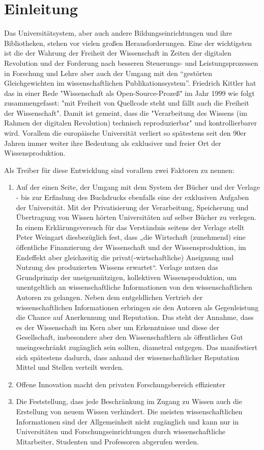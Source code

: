 \section{Einleitung} 
Das Universitätsystem, aber auch andere Bildungseinrichtungen und ihre Bibliotheken, stehen vor vielen großen Herausforderungen. Eine der wichtigsten ist die der Wahrung der Freiheit der Wissenschaft in Zeiten der digitalen Revolution und der Forderung nach besseren Steuerungs- und Leistungsprozessen in Forschung und Lehre aber auch der Umgang mit den “gestörten Gleichgewichten im wissenschaftlichen Publikationssystem”\cite{cite:0}. Friedrich Kittler hat das in einer Rede "Wissenschaft als Open-Source-Prozeß" im Jahr 1999 wie folgt zusammengefasst: "mit Freiheit von Quellcode steht und fällt auch die Freiheit der Wissenschaft". Damit ist gemeint, dass die "Verarbeitung des Wissens (im Rahmen der digitalen Revolution) technisch reproduzierbar"\cite{cite:1} und kontrollierbarer wird. Vorallem die europäische Universität verliert so spätestens seit den 90er Jahren immer weiter ihre Bedeutung als exklusiver und freier Ort der Wissensproduktion.

Als Treiber für diese Entwicklung sind vorallem zwei Faktoren zu nennen: 
\begin{enumerate}
\item Auf der einen Seite, der Umgang mit dem System der Bücher und der Verlage - bis zur Erfindung des Buchdrucks ebenfalls eine der exklusiven Aufgaben der Universität. Mit der Privatisierung der Verarbeitung, Speicherung und Übertragung von Wissen hörten Universitäten auf selber Bücher zu verlegen. In einem Erklärungsversuch für das Verständnis seitens der Verlage stellt Peter Weingart diesbezüglich fest, dass „die Wirtschaft (zunehmend) eine öffentliche Finanzierung der Wissenschaft und der Wissensproduktion, im Endeffekt aber gleichzeitig die privat(-wirtschaftliche) Aneignung und Nutzung des produzierten Wissens erwartet“\cite{cite:2}. Verlage nutzen das Grundprinzip der uneigennützigen, kollektiven Wissensproduktion, um unentgeltlich an wissenschaftliche Informationen von den wissenschaftlichen Autoren zu gelangen. Neben dem entgeldlichen Vertrieb der wissenschaftlichen Informationen erbringen sie den Autoren als Gegenleistung die Chance auf Anerkennung und Reputation. Das steht der Annahme, dass es der Wissenschaft im Kern aber um Erkenntnisse und diese der Gesellschaft, insbesondere aber den Wissenschaftlern als öffentliches Gut uneingeschränkt zugänglich sein sollten\cite{cite:3}, diametral entgegen. Das manifestiert sich spätestens dadurch, dass anhand der wissenschaftlicher Reputation Mittel und Stellen verteilt werden\cite{cite:4}.
\item Offene Innovation macht den privaten Forschungsbereich effizienter
\item Die Feststellung, dass jede Beschränkung im Zugang zu Wissen auch die Erstellung von neuem Wissen verhindert\cite{cite:5}.  Die meisten wissenschaftlichen Informationen sind der Allgemeinheit nicht zugänglich und kann nur in Universitäten und Forschungseinrichtungen durch wissenschaftliche Mitarbeiter, Studenten und Professoren abgerufen werden\cite{cite:6}. 
\end{enumerate}	

